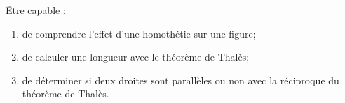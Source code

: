 \begin{myobj}
	Être capable : 
\begin{enumerate}
	\item de comprendre l'effet d'une homothétie sur une figure;
	\item de calculer une longueur avec le théorème de Thalès;
	\item de déterminer si deux droites sont parallèles ou non avec la réciproque du théorème de Thalès.  
\end{enumerate}
\end{myobj}